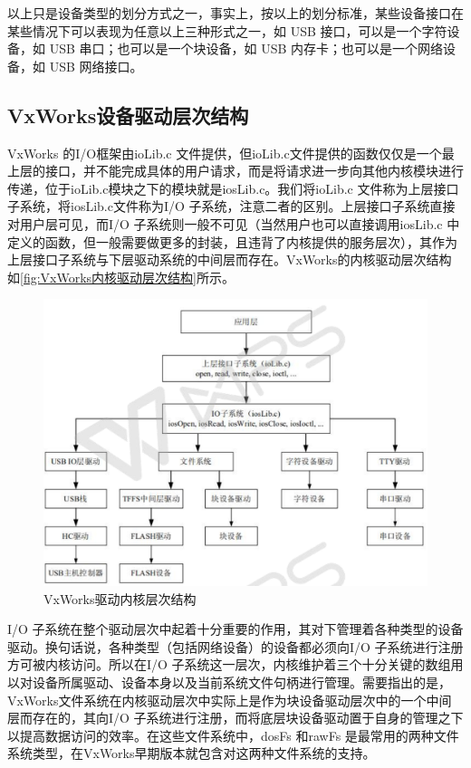 	以上只是设备类型的划分方式之一，事实上，按以上的划分标准，某些设备接口在某些情况下可以表现为任意以上三种形式之一，如 USB 接口，可以是一个字符设备，如 USB 串口；也可以是一个块设备，如 USB 内存卡；也可以是一个网络设备，如 USB 网络接口。

\subsection{VxWorks设备驱动层次结构}
	
	VxWorks 的I/O框架由ioLib.c 文件提供，但ioLib.c文件提供的函数仅仅是一个最上层的接口，并不能完成具体的用户请求，而是将请求进一步向其他内核模块进行传递，位于ioLib.c模块之下的模块就是iosLib.c。我们将ioLib.c 文件称为上层接口子系统，将iosLib.c文件称为I/O 子系统，注意二者的区别。上层接口子系统直接对用户层可见，而I/O 子系统则一般不可见（当然用户也可以直接调用iosLib.c 中定义的函数，但一般需要做更多的封装，且违背了内核提供的服务层次），其作为上层接口子系统与下层驱动系统的中间层而存在。VxWorks的内核驱动层次结构如\autoref{fig:VxWorks内核驱动层次结构}所示。

\begin{figure}[!h]
\centering
\includegraphics[width=1.0\textwidth]{./graphics/vxworks-kernel-diagram.pdf}
\caption{VxWorks驱动内核层次结构}\label{fig:VxWorks内核驱动层次结构}
\end{figure}
	
	I/O 子系统在整个驱动层次中起着十分重要的作用，其对下管理着各种类型的设备驱动。换句话说，各种类型（包括网络设备）的设备都必须向I/O 子系统进行注册方可被内核访问。所以在I/O 子系统这一层次，内核维护着三个十分关键的数组用以对设备所属驱动、设备本身以及当前系统文件句柄进行管理。需要指出的是，VxWorks文件系统在内核驱动层次中实际上是作为块设备驱动层次中的一个中间层而存在的，其向I/O 子系统进行注册，而将底层块设备驱动置于自身的管理之下以提高数据访问的效率。在这些文件系统中，dosFs 和rawFs 是最常用的两种文件系统类型，在VxWorks早期版本就包含对这两种文件系统的支持。
	
